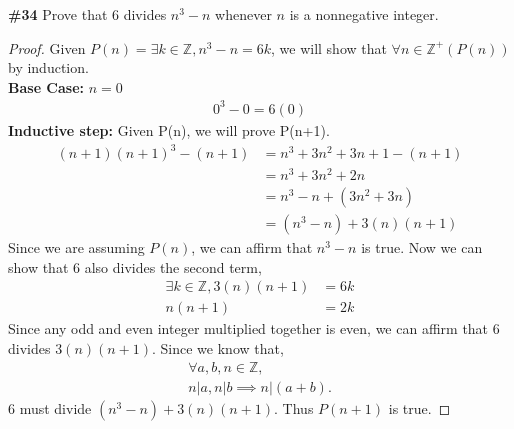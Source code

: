 \documentclass{article}
\newcommand{\problem}[1]{\textbf{\##1}}
\newcommand{\prob}[1]{\problem{#1}}
\newcommand{\AllIntegers}{\mathbb{Z}}
\begin{document}
\pagebreak
\prob{34}
Prove that 6 divides \(n^3 - n\) whenever \(n\) is a nonnegative integer.\\
\begin{proof}
    Given \(P(n) = \exists k \in \AllIntegers, n^3-n = 6k\), we will show that \(\forall n \in \AllIntegers^+(P(n))\) by induction.\\
    \textbf{Base Case:} \(n=0\)
    \begin{align*}
        0^3 - 0 = 6(0)
    \end{align*}
    \textbf{Inductive step:}
    Given P(n), we will prove P(n+1).
    \begin{align*}(n+1)
        (n+1)^3-(n+1) &= n^3+3n^2+3n+1-(n+1)\\
        &= n^3+3n^2+2n\\
        &= n^3-n+(3n^2+3n)\\
        &= (n^3 - n) + 3(n)(n+1)
    \end{align*}
    Since we are assuming \(P(n)\), we can affirm that \(n^3-n\) is true. Now we can show that 6 also divides the second term,
    \begin{align*}
        \exists k \in \AllIntegers, 3(n)(n+1) &= 6k\\
        n(n+1) &= 2k
    \end{align*}
    Since any odd and even integer multiplied together is even, we can affirm that 6 divides \(3(n)(n+1)\). Since we know that,
    \begin{align*}
        \forall a,b,n \in \AllIntegers,\\n|a, n|b \implies n|(a+b).
    \end{align*}
    6 must divide \((n^3 - n) + 3(n)(n+1)\). Thus \(P(n+1)\) is true.
\end{proof}
\end{document}
